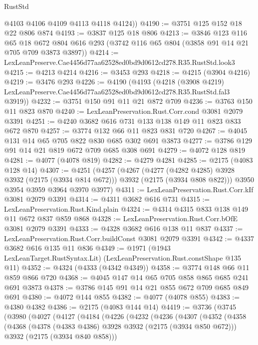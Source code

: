 \begin{lexlean}{RustStd}
\begin{coremodule}
        @4103
        @4106
        @4109
        @4113
        @4118
        @4124))
@4190 := @3751 @125 @152 @18 @22 @806 @874
@4193 := @3837 @125 @18 @806
@4213 := @3846
    @123
    @116
    @65
    @18
    @672
    @804
    @616
    @293
    (@3742 @116 @65 @804 (@3858 @91 @14 @21 @705 @709 @3873 @3897))
@4214 := LexLeanPreserve.Cae4456d77aa62528ed0bd9d0612cd278.R35.RustStd.look3
@4215 := @4213 @4214
@4216 := @3453 @293
@4218 := @4215 (@3904 @4216)
@4219 := @3476 @293
@4226 := @4190
    (@4193
      (@4218
        (@3908 @4219)
        LexLeanPreserve.Cae4456d77aa62528ed0bd9d0612cd278.R35.RustStd.fal3
        @3919))
@4232 := @3751 @150 @91 @11 @21 @872 @709
@4236 := @3763 @150 @11 @823 @870
@4240 := LexLeanPreservation.Rust.Corr.cond @3081 @2079 @3391
@4251 := @4240 @3682 @616 @731 @133 @138 @149 @11 @823 @833 @672 @870
@4257 := @3774 @132 @66 @11 @823 @831 @720
@4267 := @4045 @131 @14 @65 @705 @822 @830 @685 @302 @691 @3873
@4277 := @3786 @129 @91 @14 @21 @819 @672 @709 @685 @308 @691
@4279 := @4072 @128 @819
@4281 := @4077 (@4078 @819)
@4282 := @4279 @4281
@4285 := @2175 (@4083 @128 @14)
@4307 := @4251
    (@4257
      (@4267
        (@4277 (@4282 @4285) @3928 @3932 (@2175 (@3934 @814 @672)))
        @3932
        (@2175 (@3934 @808 @822)))
      @3950
      @3954
      @3959
      @3964
      @3970
      @3977)
@4311 := LexLeanPreservation.Rust.Corr.kIf @3081 @2079 @3391
@4314 := @4311 @3682 @616 @731
@4315 := LexLeanPreservation.Rust.Kind.plain
@4324 := @4314 @4315 @833 @138 @149 @11 @672 @837 @859 @868
@4328 := LexLeanPreservation.Rust.Corr.bOfE @3081 @2079 @3391
@4333 := @4328 @3682 @616 @138 @11 @837
@4337 := LexLeanPreservation.Rust.Corr.buildConst @3081 @2079 @3391
@4342 := @4337 @3682 @616 @135 @11 @836
@4349 := @1971 (@1943 LexLeanTarget.RustSyntax.Lit) (LexLeanPreservation.Rust.constShape @135 @11)
@4352 := @4324 (@4333 (@4342 @4349))
@4358 := @3774 @148 @66 @11 @859 @866 @720
@4368 := @4045 @147 @14 @65 @705 @858 @865 @685 @241 @691 @3873
@4378 := @3786 @145 @91 @14 @21 @855 @672 @709 @685 @849 @691
@4380 := @4072 @144 @855
@4382 := @4077 (@4078 @855)
@4383 := @4380 @4382
@4386 := @2175 (@4083 @144 @14)
@4419 := @3736
    (@3745
      (@3980
        (@4027
          (@4127
            (@4184
              (@4226
                (@4232
                  (@4236
                    (@4307
                      (@4352
                        (@4358
                          (@4368
                            (@4378 (@4383 @4386) @3928 @3932 (@2175 (@3934 @850 @672)))
                            @3932
                            (@2175 (@3934 @840 @858)))

\end{coremodule}
\end{lexlean}
